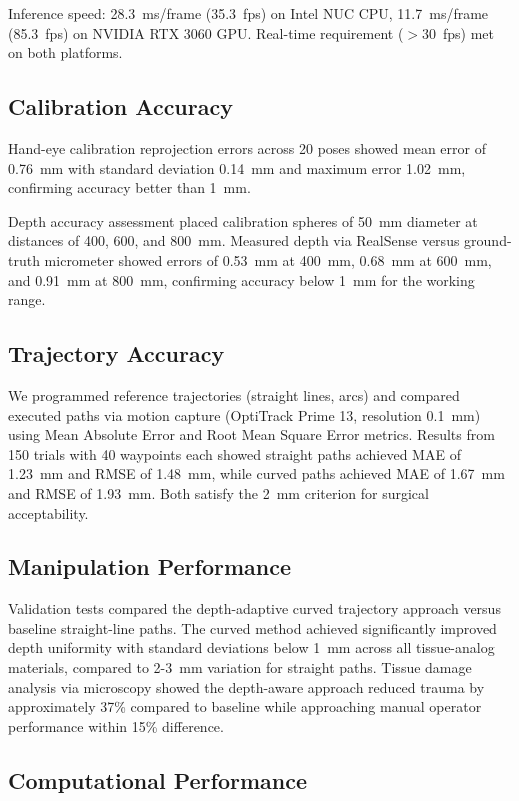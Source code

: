 \documentclass[journal]{IEEEtran}
\begin{document}
Inference speed: 28.3~ms/frame (35.3~fps) on Intel NUC CPU, 11.7~ms/frame (85.3~fps) on NVIDIA RTX 3060 GPU. Real-time requirement ($>$30~fps) met on both platforms.

\subsection{Calibration Accuracy}

Hand-eye calibration reprojection errors across 20 poses showed mean error of 0.76~mm with standard deviation 0.14~mm and maximum error 1.02~mm, confirming accuracy better than 1~mm.

Depth accuracy assessment placed calibration spheres of 50~mm diameter at distances of 400, 600, and 800~mm. Measured depth via RealSense versus ground-truth micrometer showed errors of 0.53~mm at 400~mm, 0.68~mm at 600~mm, and 0.91~mm at 800~mm, confirming accuracy below 1~mm for the working range.

\subsection{Trajectory Accuracy}

We programmed reference trajectories (straight lines, arcs) and compared executed paths via motion capture (OptiTrack Prime 13, resolution 0.1~mm) using Mean Absolute Error and Root Mean Square Error metrics. Results from 150 trials with 40 waypoints each showed straight paths achieved MAE of 1.23~mm and RMSE of 1.48~mm, while curved paths achieved MAE of 1.67~mm and RMSE of 1.93~mm. Both satisfy the 2~mm criterion for surgical acceptability.

\subsection{Manipulation Performance}

Validation tests compared the depth-adaptive curved trajectory approach versus baseline straight-line paths. The curved method achieved significantly improved depth uniformity with standard deviations below 1~mm across all tissue-analog materials, compared to 2-3~mm variation for straight paths. Tissue damage analysis via microscopy showed the depth-aware approach reduced trauma by approximately 37\% compared to baseline while approaching manual operator performance within 15\% difference.

\subsection{Computational Performance}
\end{document}
